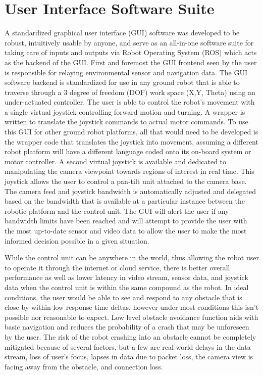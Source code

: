 \section{User Interface Software Suite}\label{sec:ui}

A standardized graphical user interface (GUI) software was developed to be robust, intuitively usable by anyone, and serve as an all-in-one software suite for taking care of inputs and outputs via Robot Operating System (ROS) which acts as the backend of the GUI. First and foremost the GUI frontend seen by the user is responsible for relaying environmental sensor and navigation data. The GUI software backend is standardized for use in any ground robot that is able to traverse through a 3 degree of freedom (DOF) work space (X,Y, Theta) using an under-actuated controller. The user is able to control the robot's movement with a single virtual joystick controlling forward motion and turning. A wrapper is written to translate the joystick commands to actual motor commands. To use this GUI for other ground robot platforms, all that would need to be developed is the wrapper code that translates the joystick into movement, assuming a different robot platform will have a different language coded onto its on-board system or motor controller. A second virtual joystick is available and dedicated to manipulating the camera viewpoint towards regions of interest in real time. This joystick allows the user to control a pan-tilt unit attached to the camera base. The camera feed and joystick bandwidth is automatically adjusted and delegated based on the bandwidth that is available at a particular instance between the robotic platform and the control unit. The GUI will alert the user if any bandwidth limits have been reached and will attempt to provide the user with the most up-to-date sensor and video data to allow the user to make the most informed decision possible in a given situation. 

While the control unit can be anywhere in the world, thus allowing the robot user to operate it through the internet or cloud service, there is better overall performance as well as lower latency in video stream, sensor data, and joystick data when the control unit is within the same compound as the robot. In ideal conditions, the user would be able to see and respond to any obstacle that is close by within low response time deltas, however under most conditions this isn't possible nor reasonable to expect. Low level obstacle avoidance function aids with basic navigation and reduces the probability of a crash that may be unforeseen by the user. The risk of the robot crashing into an obstacle cannot be completely mitigated because of several factors, but a few are real world delays in the data stream, loss of user's focus, lapses in data due to packet loss, the camera view is facing away from the obstacle, and connection loss.

